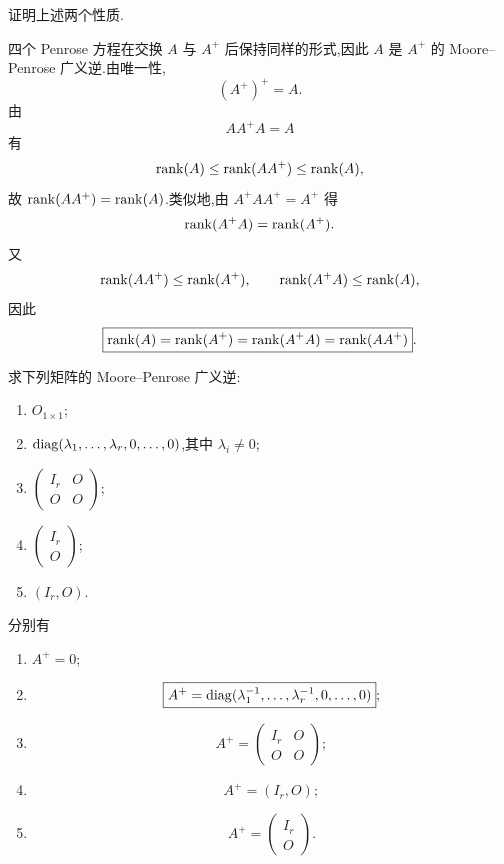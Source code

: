 \begin{example}
证明上述两个性质.
\end{example}
\exampleblank

\begin{solution}
四个 Penrose 方程在交换 $A$ 与 $A^+$ 后保持同样的形式,因此 $A$ 是 $A^+$ 的 Moore--Penrose 广义逆.由唯一性,
\[
\boxed{(A^+)^+=A}.
\]
由
\[
AA^+A=A
\]
有
\[
\operatorname{rank}(A)
\leq\operatorname{rank}(AA^+)
\leq\operatorname{rank}(A),
\]
故 $\operatorname{rank}(AA^+)=\operatorname{rank}(A)$.类似地,由 $A^+AA^+=A^+$ 得
\[
\operatorname{rank}(A^+A)=\operatorname{rank}(A^+).
\]
又
\[
\operatorname{rank}(AA^+)\leq\operatorname{rank}(A^+),
\qquad
\operatorname{rank}(A^+A)\leq\operatorname{rank}(A),
\]
因此
\[
\boxed{
\operatorname{rank}(A)=\operatorname{rank}(A^+)=\operatorname{rank}(A^+A)=\operatorname{rank}(AA^+)
}.
\]
\end{solution}

\begin{example}
求下列矩阵的 Moore--Penrose 广义逆:
\begin{enumerate}
  \item $O_{1\times1}$;
  \item $\operatorname{diag}(\lambda_1,\ldots,\lambda_r,0,\ldots,0)$,其中 $\lambda_i\neq0$;
  \item $\begin{pmatrix}I_r&O\\O&O\end{pmatrix}$;
  \item $\begin{pmatrix}I_r\\O\end{pmatrix}$;
  \item $(I_r,O)$.
\end{enumerate}
\end{example}
\exampleblank

\begin{solution}
分别有
\begin{enumerate}
  \item $\boxed{A^+=0}$;
  \item
  \[
  \boxed{
  A^+=\operatorname{diag}(\lambda_1^{-1},\ldots,\lambda_r^{-1},0,\ldots,0)
  };
  \]
  \item
  \[
  \boxed{
  A^+=\begin{pmatrix}I_r&O\\O&O\end{pmatrix}
  };
  \]
  \item
  \[
  \boxed{A^+=(I_r,O)};
  \]
  \item
  \[
  \boxed{A^+=\begin{pmatrix}I_r\\O\end{pmatrix}}.
  \]
\end{enumerate}
\end{solution}


